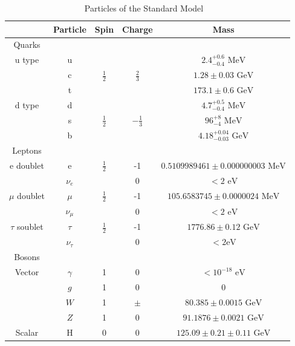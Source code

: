 \begin{table}[h]
\begin{center}
\footnotesize
\begin{tabular}[h]{|c||c|c|c|c|}
\hline
 & Particle & Spin & Charge & Mass \\
\hline\hline
Quarks &&&&\\
\hline
u type &u& & &${2.4^{+0.6}_{-0.4} \text{ MeV}}$\\
 &c&${\frac{1}{2}}$&${\frac{2}{3}}$&${1.28\pm{0.03} \text{ GeV}}$\\
 &t& & &${173.1\pm{0.6} \text{ GeV}}$\\
\hline
d type & d& & & ${4.7^{+0.5}_{-0.4} \text{ MeV}}$\\
 & s & ${\frac{1}{2}}$ & ${-\frac{1}{3}}$ & ${96^{+8}_{-4} \text{ MeV}}$\\
 & b & & & ${4.18^{+0.04}_{-0.03} \text{ GeV}}$\\
\hline\hline
Leptons &&&&\\
\hline
e doublet & e & ${\frac{1}{2}}$ & -1 &${0.5109989461\pm{}0.000000003 \text{ MeV}}$\\
 & ${\nu_{e}}$ & & 0 & ${< 2 \text{ eV}}$\\
 \hline
${\mu}$ doublet & ${\mu}$ & ${\frac{1}{2}}$ & -1 &${105.6583745\pm{}0.0000024 \text{ MeV}}$\\
 & ${\nu_{\mu}}$ & & 0 & ${< 2 \text{ eV}}$\\
 \hline
${\tau}$ soublet & ${\tau}$ & ${\frac{1}{2}}$ & -1 &${1776.86\pm{}0.12 \text{ GeV}}$\\
 & ${\nu_{\tau}}$ & & 0 & ${< 2 \text{eV}}$\\
 \hline\hline
 Bosons &&&&\\
 \hline
 Vector & ${\gamma}$ & 1 & 0 & ${< 10^{-18} \text{ eV}}$\\
 & ${g}$ & 1 & 0 & ${0}$\\
 & ${W}$ & 1 & ${\pm}$ & ${80.385\pm{}0.0015 \text{ GeV}}$\\
 & ${Z}$ & 1 & 0 & ${91.1876\pm{}0.0021 \text{ GeV}}$\\
 \hline
 Scalar & H & 0& 0 & ${125.09\pm{}0.21\pm{}0.11 \text{ GeV}}$\\
 \hline
\end{tabular}
\caption[Particles of the Standard Model]{Particles of the Standard Model ~\cite{PhysRevD.98.030001}}
\label{tab:SM}
\end{center}
\end{table}

